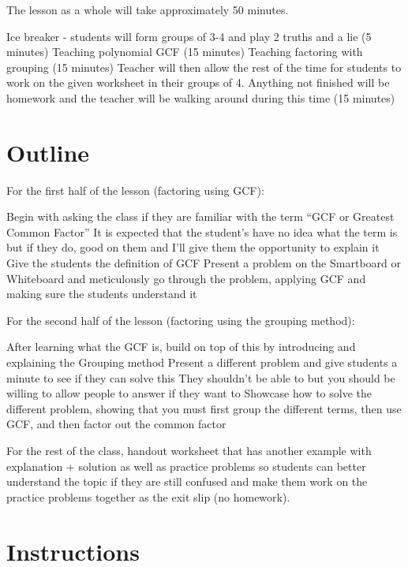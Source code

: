 The lesson as a whole will take approximately 50 minutes.
\begin{outline}
    \1 Ice breaker - students will form groups of 3-4 and play 2 truths and a lie (5 minutes)
    \1 Teaching polynomial GCF (15 minutes)
    \1 Teaching factoring with grouping (15 minutes)
    \1 Teacher will then allow the rest of the time for students to work on the given worksheet in their groups of 4. Anything not finished will be homework and the teacher will be walking around during this time (15 minutes)
\end{outline}

\section{Outline}

For the first half of the lesson (factoring using GCF):
\begin{outline}
    \1 Begin with asking the class if they are familiar with the term ``GCF or Greatest Common Factor''
        \2 It is expected that the student's have no idea what the term is but if they do, good on them and I'll give them the opportunity to explain it
    \1 Give the students the definition of GCF
    \1 Present a problem on the Smartboard or Whiteboard and meticulously go through the problem, applying GCF and making sure the students understand it
\end{outline}

For the second half of the lesson (factoring using the grouping method):
\begin{outline}
    \1 After learning what the GCF is, build on top of this by introducing and explaining the Grouping method
    \1 Present a different problem and give students a minute to see if they can solve this
        \2 They shouldn't be able to but you should be willing to allow people to answer if they want to
    \1 Showcase how to solve the different problem, showing that you must first group the different terms, then use GCF, and then factor out the common factor
\end{outline}

For the rest of the class, handout worksheet that has another example with explanation + solution as well as practice problems so students can better understand the topic if they are still confused and make them work on the practice problems together as the exit slip (no homework).

\section{Instructions}

